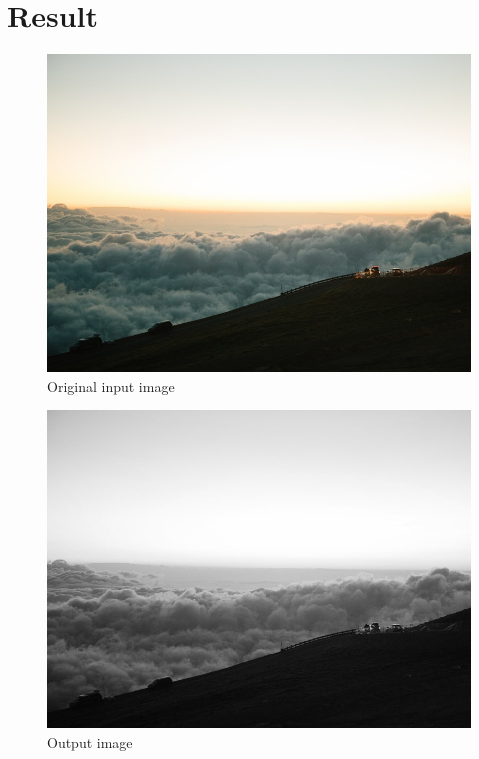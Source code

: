 \documentclass{article}
\begin{document}
\section*{Result}
\begin{figure}[h]
\center\includegraphics[scale=0.3]{./labwork/data/cloud.jpeg}
\caption{Original input image}
\end{figure}
\begin{figure}[h]
\center\includegraphics[scale=0.3]{./labwork/build/labwork3-gpu-out.jpg}
\caption{Output image}
\end{figure}
\end{document}
